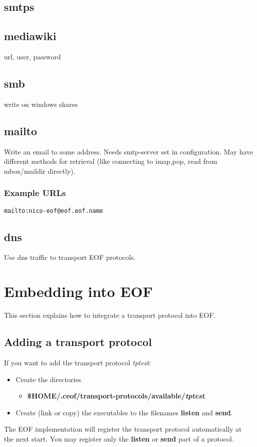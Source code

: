 \documentclass[12pt,a4paper]{book}
\begin{document}
\subsection{smtps}
\subsection{mediawiki}
url, user, password
\subsection{smb}
write on windows shares
\subsection{mailto}
Write an email to some address. Needs smtp-server set in configuration.
May have different methods for retrieval (like connecting to imap,pop,
read from mbox/maildir directly).
\subsubsection{Example URLs}
\begin{verbatim}
mailto:nico-eof@eof.eof.name
\end{verbatim}
\subsection{dns}
Use dns traffic to transport EOF protocols.

\section{Embedding into EOF}
This section explains how to integrate a transport protocol into EOF.
\subsection{Adding a transport protocol}
If you want to add the transport protocol \emph{tptest}:
\begin{itemize}
\item Create the directories
\begin{itemize}
\item \textbf{\$HOME/.ceof/transport-protocols/available/\emph{tptest}}.
\end{itemize}
\item Create (link or copy) the executables to the filenames \textbf{listen}
and \textbf{send}.
\end{itemize}
The EOF implementation will register the transport protocol automatically
at the next start. You may register only the \textbf{listen} or
\textbf{send} part of a protocol.
\end{document}
